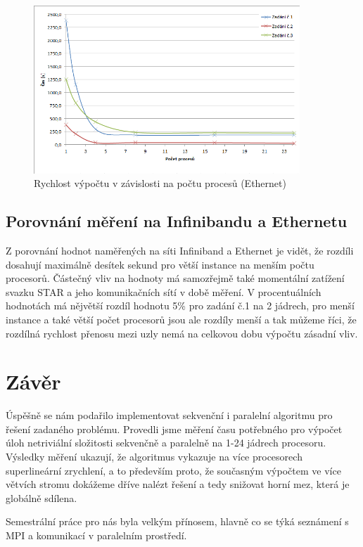 \documentclass[12pt]{article}
\begin{document}
\begin{figure}[h]
\begin{center}
\includegraphics[width=100mm]{cpu_time_ethernet.png}
\caption{Rychlost výpočtu v závislosti na počtu procesů (Ethernet)}
\label{fig:ct_inifini}
\end{center}
\end{figure}


\subsection{Porovnání měření na Infinibandu a Ethernetu}
Z porovnání hodnot naměřených na síti Infiniband a Ethernet je vidět, že rozdíli dosahují maximálně desítek sekund pro větší instance na menším počtu procesorů. Částečný vliv na hodnoty má samozřejmě také momentální zatížení svazku STAR a jeho komunikačních sítí v době měření. V procentuálních hodnotách má nějvětší rozdíl hodnotu 5\% pro zadání č.1 na 2 jádrech, pro menší instance a také větší počet procesorů jsou ale rozdíly menší a tak můžeme říci, že rozdílná rychlost přenosu mezi uzly nemá na celkovou dobu výpočtu zásadní vliv.

\section{Závěr}

Úspěšně se nám podařilo implementovat sekvenční i paralelní algoritmu pro řešení zadaného problému.
Provedli jsme měření času potřebného pro výpočet  úloh netriviální složitosti sekvenčně a paralelně na 1-24 jádrech procesoru.
Výsledky měření ukazují, že algoritmus vykazuje na více procesorech superlineární zrychlení, a to především proto, že současným 
výpočtem ve více větvích stromu dokážeme dříve nalézt  řešení a tedy snižovat horní mez, která je globálně sdílena.

Semestrální práce pro nás byla velkým přínosem, hlavně co se týká seznámení s MPI a komunikací v paralelním prostředí. 
\end{document}
